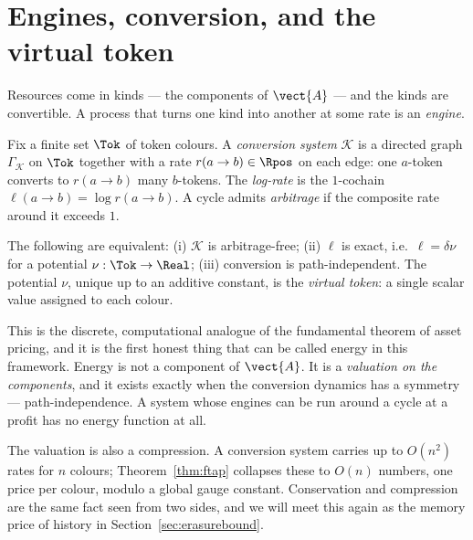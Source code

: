 \section{Engines, conversion, and the virtual token}

Resources come in kinds --- the components of $\vect{A}$ --- and the kinds
are convertible.  A process that turns one kind into another at some rate
is an \emph{engine}.

\begin{definition}
\label{def:conv}
Fix a finite set $\Tok$ of token colours.  A \emph{conversion system}
$\mathcal{K}$ is a directed graph $\Gamma_{\mathcal K}$ on $\Tok$ together
with a rate $r(a \to b) \in \Rpos$ on each edge: one $a$-token converts to
$r(a\to b)$ many $b$-tokens.  The \emph{log-rate} is the $1$-cochain
$\ell(a \to b) = \log r(a\to b)$.  A cycle admits \emph{arbitrage} if the
composite rate around it exceeds $1$.
\end{definition}

\begin{theorem}
\label{thm:ftap}
The following are equivalent: (i) $\mathcal{K}$ is arbitrage-free; (ii)
$\ell$ is exact, i.e.\ $\ell = \delta\nu$ for a potential
$\nu : \Tok \to \Real$; (iii) conversion is path-independent.  The
potential $\nu$, unique up to an additive constant, is the
\emph{virtual token}: a single scalar value assigned to each colour.
\end{theorem}

This is the discrete, computational analogue of the fundamental theorem of
asset pricing, and it is the first honest thing that can be called energy
in this framework.  Energy is not a component of $\vect{A}$.  It is a
\emph{valuation on the components}, and it exists exactly when the
conversion dynamics has a symmetry --- path-independence.  A system whose
engines can be run around a cycle at a profit has no energy function at
all.

\begin{remark}[Compression]
The valuation is also a compression.  A conversion system carries up to
$O(n^2)$ rates for $n$ colours; Theorem~\ref{thm:ftap} collapses these to
$O(n)$ numbers, one price per colour, modulo a global gauge constant.
Conservation and compression are the same fact seen from two sides, and we
will meet this again as the memory price of history in
Section~\ref{sec:erasurebound}.
\end{remark}

